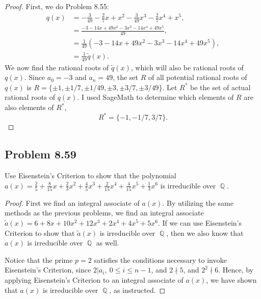 \documentclass[letterpaper, 12pt]{amsart}
\DeclareMathOperator{\Q}{\mathbb{Q}}
\begin{document}
		\begin{proof}
		First, we do Problem 8.55:
			\begin{align*}
			q(x) &= -\frac{3}{49} - \frac{2}{7}x + x^{2} - \frac{3}{49}x^{3} - \frac{2}{7}x^{4} + x^{5}, \\
			&= \frac{-3 - 14x + 49x^{2} - 3x^{3} - 14x^{4} + 49x^{5}}{49}, \\
			&= \frac{1}{49} \left( -3 - 14x + 49x^{2} - 3x^{3} - 14x^{4} + 49x^{5} \right), \\
			&= \frac{1}{49} \tilde{q}(x).
			\end{align*}
		We now find the rational roots of $\tilde{q}(x)$, which will also be rational roots of $q(x)$.
		Since $a_{0} = -3$ and $a_{n} = 49$, the set $R$ of all potential rational roots of $q(x)$ is $R = \{ \pm 1, \pm 1/7, \pm 1/49, \pm 3, \pm 3/7, \pm 3/49 \}$.
		Let $R^{*}$ be the set of actual rational roots of $q(x)$.
		I used SageMath to determine which elements of $R$ are also elements of $R^{*}$, \[ R^{*} = \{ -1, -1/7, 3/7 \}. \]
		\end{proof}

		\subsection*{Problem 8.59}
		\label{sub:problem_8_59}
		Use Eisenstein's Criterion to show that the polynomial $a(x) = \frac{2}{5} + \frac{8}{15}x + \frac{2}{3}x^{2} + \frac{4}{5}x^{3} + \frac{2}{15}x^{4} + \frac{4}{15}x^{5} + \frac{1}{3}x^{6}$ is irreducible over $\Q$.

		\begin{proof}
		First we find an integral associate of $a(x)$. 
		By utilizing the same methods as the previous problems, we find an integral associate $\tilde{a}(x) = 6 + 8x + 10x^{2} + 12x^{3} + 2x^{4} + 4x^{5} + 5x^{6}$.
		If we can use Eisenstein's Criterion to show that $\tilde{a}(x)$ is irreducible over $\Q$, then we also know that $a(x)$ is irreducible over $\Q$ as well.

		Notice that the prime $p = 2$ satisfies the conditions necessary to invoke Eisenstein's Criterion, since $2 | a_{i}, \ 0 \leq i \leq n-1$, and $2 \nmid 5$, and $2^{2} \nmid 6$.
		Hence, by applying Eisenstein's Criterion to an integral associate of $a(x)$, we have shown that $a(x)$ is irreducible over $\Q$, as instructed.
		\end{proof}
		\vspace{1cm}
\end{document}
